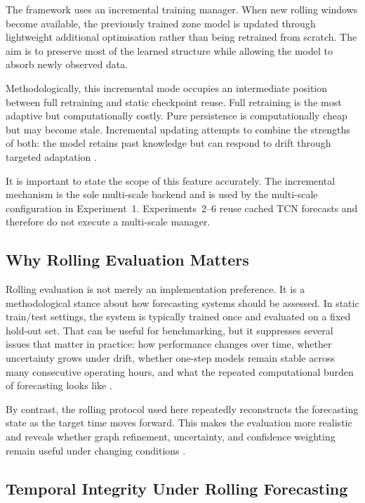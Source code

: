 \documentclass[12pt,a4paper]{report}
\begin{document}
The framework uses an incremental training manager. When new rolling windows become available, the previously trained zone model is updated through lightweight additional optimisation rather than being retrained from scratch. The aim is to preserve most of the learned structure while allowing the model to absorb newly observed data.

Methodologically, this incremental mode occupies an intermediate position between full retraining and static checkpoint reuse. Full retraining is the most adaptive but computationally costly. Pure persistence is computationally cheap but may become stale. Incremental updating attempts to combine the strengths of both: the model retains past knowledge but can respond to drift through targeted adaptation \cite{cavalcante2024review}.

It is important to state the scope of this feature accurately. The incremental mechanism is the sole multi-scale backend and is used by the multi-scale configuration in Experiment~1. Experiments~2--6 reuse cached TCN forecasts and therefore do not execute a multi-scale manager.

\subsection{Why Rolling Evaluation Matters}

Rolling evaluation is not merely an implementation preference. It is a methodological stance about how forecasting systems should be assessed. In static train/test settings, the system is typically trained once and evaluated on a fixed hold-out set. That can be useful for benchmarking, but it suppresses several issues that matter in practice: how performance changes over time, whether uncertainty grows under drift, whether one-step models remain stable across many consecutive operating hours, and what the repeated computational burden of forecasting looks like \cite{hewamalage2022pitfalls,cerqueira2020evaluating}.

By contrast, the rolling protocol used here repeatedly reconstructs the forecasting state as the target time moves forward. This makes the evaluation more realistic and reveals whether graph refinement, uncertainty, and confidence weighting remain useful under changing conditions \cite{hewamalage2022pitfalls}.

\subsection{Temporal Integrity Under Rolling Forecasting}
\end{document}
